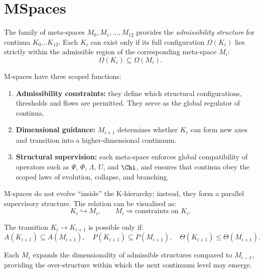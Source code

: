 

\section{MSpaces}
\label{sec:mspaces-overview}

The family of meta-spaces $M_0, M_1, \dots, M_{12}$ provides the
\emph{admissibility structure} for continua $K_0\dots K_{12}$.
Each $K_i$ can exist only if its full configuration
$\Omega(K_i)$ lies strictly within the admissible region of the corresponding
meta-space $M_i$:
\[
\Omega(K_i) \subseteq \Omega(M_i).
\]

M-spaces have three scoped functions:

\begin{enumerate}
    \item \textbf{Admissibility constraints:}
    they define which structural configurations, thresholds and flows are permitted.
    They serve as the global regulator of continua.

    \item \textbf{Dimensional guidance:}
    $M_{i+1}$ determines whether $K_i$ can form new axes and transition
    into a higher-dimensional continuum.

    \item \textbf{Structural supervision:}
    each meta-space enforces global compatibility of operators
    such as $\Psi$, $\Phi$, $\Lambda$, $U$, and $\Chi$, and ensures that
    continua obey the scoped laws of evolution, collapse, and branching.
\end{enumerate}

M-spaces do not evolve “inside” the K-hierarchy; instead,
they form a parallel supervisory structure.
The relation can be visualised as:
\[
K_i \hookrightarrow M_i,\qquad 
M_i \Rightarrow \text{constraints on } K_i.
\]

The transition $K_i \to K_{i+1}$ is possible only if:
\[
A(K_{i+1}) \subseteq A(M_{i+1}), \quad
P(K_{i+1}) \subseteq P(M_{i+1}),\quad
\Theta(K_{i+1}) \leq \Theta(M_{i+1}).
\]

Each $M_i$ expands the dimensionality of admissible structures compared to
$M_{i-1}$, providing the over-structure within which the next continuum level
may emerge.
